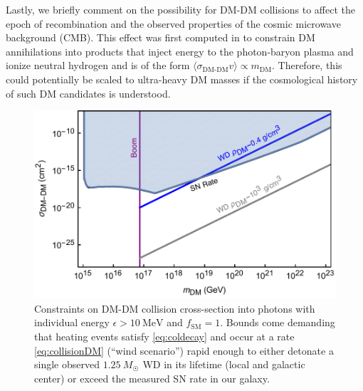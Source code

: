\documentclass[twocolumn, preprintnumbers,amsmath,amssymb,prd, superscriptaddress]{revtex4}
\begin{document}
Lastly, we briefly comment on the possibility for DM-DM collisions to affect the epoch of recombination and the observed properties of the cosmic microwave background (CMB).
This effect was first computed in \cite{Padmanabhan:2005es} to constrain DM annihilations into products that inject energy to the photon-baryon plasma and ionize neutral hydrogen and is of the form $\langle \sigma_\text{DM-DM} v \rangle \propto m_\text{DM}$.
Therefore, this could potentially be scaled to ultra-heavy DM masses if the cosmological history of such DM candidates is understood.



\begin{figure}
\includegraphics[scale=.45]{collisionobservation.pdf}
\caption{Constraints on DM-DM collision cross-section into photons with individual energy $\epsilon > 10~\text{MeV}$ and $f_\text{SM} = 1$. Bounds come demanding that heating events satisfy \eqref{eq:coldecay} and occur at a rate \eqref{eq:collisionDM} (``wind scenario'') rapid enough to either detonate a single observed $1.25~M_{\astrosun}$ WD in its lifetime (local and galactic center) or exceed the measured SN rate in our galaxy.}
\label{fig:collisionclasses}
\end{figure}
\end{document}

